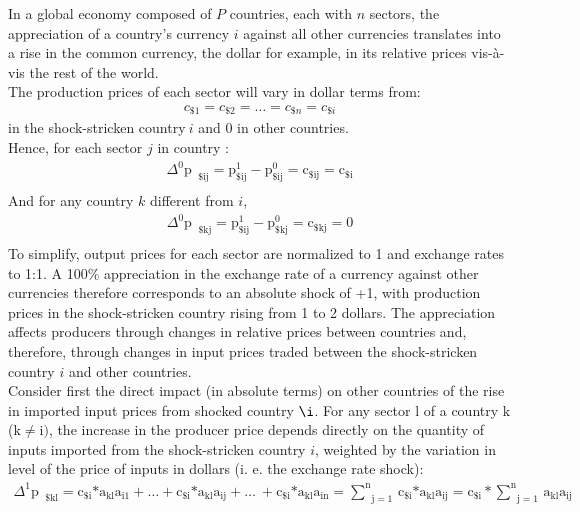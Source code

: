 \documentclass[11pt,a4paper]{article}
\begin{document}
In a global economy composed of $P$ countries, each with $n$ sectors, the appreciation of a country's currency $i$ against all other currencies translates into a rise in the common currency, the dollar for example, in its relative prices vis-\`a-vis the rest of the world. \\ 
The production prices of each sector will vary in dollar terms from:
\begin{eqnarray}
c_{\$1}=c_{\$2}=\ldots=c_{\$n}=c_{\$i} 
  \end{eqnarray}	
in the shock-stricken country$~i$ and 0 in other countries. \\
Hence, for each sector $j$ in country  :
\begin{eqnarray}
 {{\Delta }^{0}}{{\text{p}}_{\text{ }\!\!\$\!\!\text{ij}}}=\text{p}_{\text{}\!\!\$\!\!\text{ij}}^{1}-\text{p}_{\text{}\!\!\$\!\!\text{ij}}^{0}={{\text{c}}_{\text{}\!\!\$\!\!\text{ij}}}={{\text{c}}_{\text{}\!\!\$\!\!\text{i}}}\\
  \end{eqnarray}	
And for any country $k$ different from $i$,
\begin{eqnarray}
 {{\Delta }^{0}}{{\text{p}}_{\text{ }\!\!\$\!\!\text{kj}}}=\text{p}_{\text{}\!\!\$\!\!\text{ij}}^{1}-\text{p}_{\text{}\!\!\$\!\!\text{kj}}^{0}={{\text{c}}_{\text{}\!\!\$\!\!\text{kj}}}=0  \\
 \end{eqnarray}	
To simplify, output prices for each sector are normalized to 1 and exchange rates to 1:1. A 100$\%$ appreciation in the exchange rate of a currency against other currencies therefore corresponds to an absolute shock of +1, with production prices in the shock-stricken country rising from 1 to 2 dollars. The appreciation affects producers through changes in relative prices between countries and, therefore, through changes in input prices traded between the shock-stricken country $i$ and other countries. \\
Consider first the direct impact (in absolute terms) on other countries of the rise in imported input prices from shocked country $\i$. For any sector l of a country $\text{k}$ ($\text{k}\ne \text{i})$, the increase in the producer price depends directly on the quantity of inputs imported from the shock-stricken country $i$, weighted by the variation in level of the price of inputs in dollars (i. e. the exchange rate shock):\\
\begin{eqnarray}
{{\Delta }^{1}}{{\text{p}}_{\text{ }\!\!\$\!\!\text{kl}}}={{\text{c}}_{\text{}\!\!\$\!\!\text{i}}}\text{*}{{\text{a}}_{\text{kl}}}{{\text{a}}_{\text{i}1}}+\ldots+{{\text{c}}_{\text{}\!\!\$\!\!\text{i}}}\text{*}{{\text{a}}_{\text{kl}}}{{\text{a}}_{\text{ij}}}+\ldots\text{}\!\!~\!\!\text{}+{{\text{c}}_{\text{}\!\!\$\!\!\text{i}}}\text{*}{{\text{a}}_{\text{kl}}}{{\text{a}}_{\text{in}}}=\underset{\text{j}=1}{\overset{\text{n}}{\mathop\sum}}\,{{\text{c}}_{\text{}\!\!\$\!\!\text{i}}}\text{*}{{\text{a}}_{\text{kl}}}{{\text{a}}_{\text{ij}}}={{\text{c}}_{\text{}\!\!\$\!\!\text{i}}}*\underset{\text{j}=1}{\overset{\text{n}}{\mathop\sum}}\,{{\text{a}}_{\text{kl}}}{{\text{a}}_{\text{ij}}}   \\
\end{eqnarray}
\end{document}
